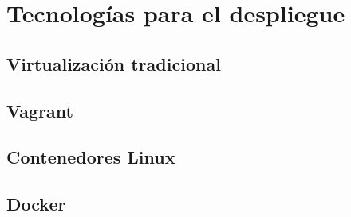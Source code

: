 \documentclass[11pt,a4paper]{article}
\begin{document}
\section{Tecnologías para el despliegue}

\subsection{Virtualización tradicional}

\subsection{Vagrant}

\subsection{Contenedores Linux}

\subsection{Docker}
\end{document}
